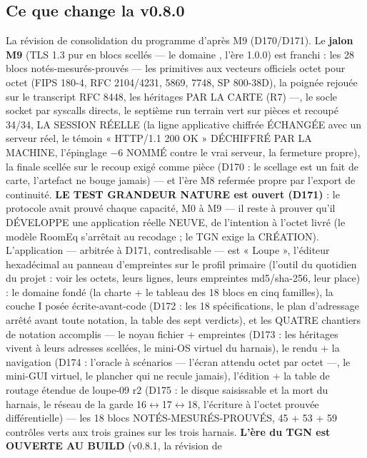 \subsection{Ce que change la v0.8.0}\label{sec:nouveautes080}

La révision de consolidation du programme d'après M9 (D170/D171). Le \textbf{jalon M9}
(TLS 1.3 pur en blocs scellés — le domaine , l'ère 1.0.0) est franchi : les
28 blocs notés-mesurés-prouvés — les primitives aux vecteurs officiels octet pour octet
(FIPS 180-4, RFC 2104/4231, 5869, 7748, SP 800-38D), la poignée rejouée sur le
transcript RFC 8448, les héritages PAR LA CARTE (R7) —, le socle socket par syscalls
directs, le septième run terrain vert sur pièces et recoupé 34/34, LA SESSION RÉELLE
(la ligne applicative chiffrée ÉCHANGÉE avec un serveur réel, le témoin
« HTTP/1.1 200 OK » DÉCHIFFRÉ PAR LA MACHINE, l'épinglage $-6$ NOMMÉ contre le vrai
serveur, la fermeture propre), la finale  scellée sur le recoup exigé
comme pièce (D170 : le scellage est un fait de carte, l'artefact ne bouge jamais) — et
l'ère M8 refermée propre par l'export de continuité. \textbf{LE TEST GRANDEUR NATURE
est ouvert (D171)} : le protocole avait prouvé chaque capacité, M0 à M9 — il reste à
prouver qu'il DÉVELOPPE une application réelle NEUVE, de l'intention à l'octet livré
(le modèle RoomEq s'arrêtait au recodage ; le TGN exige la CRÉATION). L'application —
arbitrée à D171, contredisable — est « Loupe », l'éditeur hexadécimal au panneau
d'empreintes sur le profil primaire (l'outil du quotidien du projet : voir les octets,
leurs lignes, leurs empreintes md5/sha-256, leur place) : le domaine 
fondé (la charte + le tableau des 18 blocs en cinq familles), la couche I posée
écrite-avant-code (D172 : les 18 spécifications, le plan d'adressage arrêté avant
toute notation, la table des sept verdicts), et les QUATRE chantiers de notation
accomplis — le noyau fichier + empreintes (D173 : les héritages vivent à leurs
adresses scellées, le mini-OS virtuel du harnais), le rendu + la navigation (D174 :
l'oracle à scénarios — l'écran attendu octet par octet —, le mini-GUI virtuel, le
plancher qui ne recule jamais), l'édition + la table de routage étendue de loupe-09
r2 (D175 : le disque saisissable et la mort du harnais, le réseau de la garde
16$\leftrightarrow$17$\leftrightarrow$18, l'écriture à l'octet prouvée différentielle) —
les 18 blocs NOTÉS-MESURÉS-PROUVÉS, 45 + 53 + 59 contrôles verts aux trois graines sur
les trois harnais. \textbf{L'ère du TGN est OUVERTE AU BUILD} (v0.8.1, la révision de
